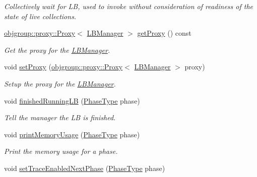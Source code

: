 \begin{DoxyCompactItemize}
\begin{DoxyCompactList}\small\item\em Collectively wait for LB, used to invoke without consideration of readiness of the state of live collections. \end{DoxyCompactList}\item 
\hyperlink{structvt_1_1objgroup_1_1proxy_1_1_proxy}{objgroup\+::proxy\+::\+Proxy}$<$ \hyperlink{structvt_1_1vrt_1_1collection_1_1balance_1_1_l_b_manager}{L\+B\+Manager} $>$ \hyperlink{structvt_1_1vrt_1_1collection_1_1balance_1_1_l_b_manager_aa0fbba6d90873e5fa6e40767efcabb5c}{get\+Proxy} () const
\begin{DoxyCompactList}\small\item\em Get the proxy for the \hyperlink{structvt_1_1vrt_1_1collection_1_1balance_1_1_l_b_manager}{L\+B\+Manager}. \end{DoxyCompactList}\item 
void \hyperlink{structvt_1_1vrt_1_1collection_1_1balance_1_1_l_b_manager_aacef5b639acd9d984b9bcb79ecb9c6a9}{set\+Proxy} (\hyperlink{structvt_1_1objgroup_1_1proxy_1_1_proxy}{objgroup\+::proxy\+::\+Proxy}$<$ \hyperlink{structvt_1_1vrt_1_1collection_1_1balance_1_1_l_b_manager}{L\+B\+Manager} $>$ proxy)
\begin{DoxyCompactList}\small\item\em Setup the proxy for the \hyperlink{structvt_1_1vrt_1_1collection_1_1balance_1_1_l_b_manager}{L\+B\+Manager}. \end{DoxyCompactList}\item 
void \hyperlink{structvt_1_1vrt_1_1collection_1_1balance_1_1_l_b_manager_af78c27f2e951e965e287273461ad1d3e}{finished\+Running\+LB} (\hyperlink{namespacevt_a46ce6733d5cdbd735d561b7b4029f6d7}{Phase\+Type} phase)
\begin{DoxyCompactList}\small\item\em Tell the manager the LB is finished. \end{DoxyCompactList}\item 
void \hyperlink{structvt_1_1vrt_1_1collection_1_1balance_1_1_l_b_manager_ab4b84a51a709bf75f64b3158c29eddc8}{print\+Memory\+Usage} (\hyperlink{namespacevt_a46ce6733d5cdbd735d561b7b4029f6d7}{Phase\+Type} phase)
\begin{DoxyCompactList}\small\item\em Print the memory usage for a phase. \end{DoxyCompactList}\item 
void \hyperlink{structvt_1_1vrt_1_1collection_1_1balance_1_1_l_b_manager_abb0411627a6282d0c08dd1c6b42046f7}{set\+Trace\+Enabled\+Next\+Phase} (\hyperlink{namespacevt_a46ce6733d5cdbd735d561b7b4029f6d7}{Phase\+Type} phase)

\end{DoxyCompactItemize}

